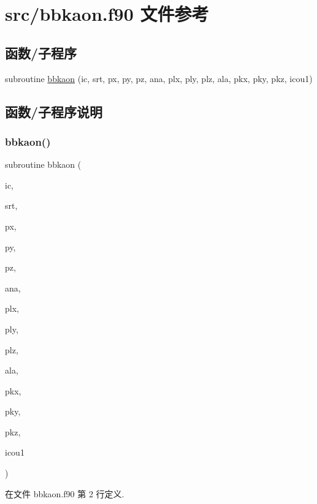 \hypertarget{bbkaon_8f90}{}\section{src/bbkaon.f90 文件参考}
\label{bbkaon_8f90}
\subsection*{函数/子程序}
\begin{DoxyCompactItemize}
\item 
subroutine \mbox{\hyperlink{bbkaon_8f90_a0a3a439645ab2baeedbca17e9ac2f4e2}{bbkaon}} (ic, srt, px, py, pz, ana, plx, ply, plz, ala, pkx, pky, pkz, icou1)
\end{DoxyCompactItemize}


\subsection{函数/子程序说明}
\mbox{\label{bbkaon_8f90_a0a3a439645ab2baeedbca17e9ac2f4e2}} 
\subsubsection{\texorpdfstring{bbkaon()}{bbkaon()}}
{\footnotesize\ttfamily subroutine bbkaon (\begin{DoxyParamCaption}\item[{}]{ic,  }\item[{}]{srt,  }\item[{}]{px,  }\item[{}]{py,  }\item[{}]{pz,  }\item[{}]{ana,  }\item[{}]{plx,  }\item[{}]{ply,  }\item[{}]{plz,  }\item[{}]{ala,  }\item[{}]{pkx,  }\item[{}]{pky,  }\item[{}]{pkz,  }\item[{}]{icou1 }\end{DoxyParamCaption})}



在文件 bbkaon.\+f90 第 2 行定义.

